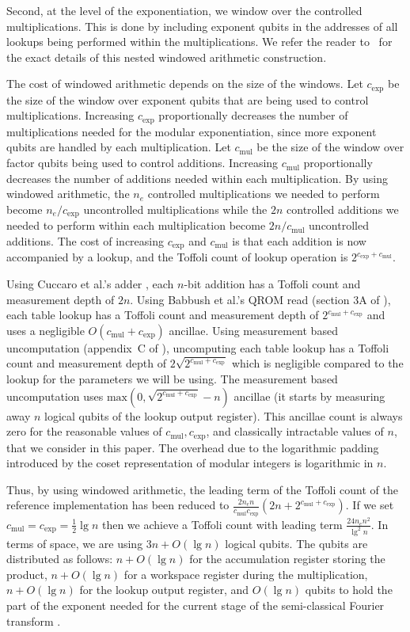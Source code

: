 \documentclass[superscriptaddress,notitlepage,longbibliography]{revtex4-1}
\theoremstyle{definition}
\theoremstyle{definition}
\newcommand{\lenexp}{{n_e}}
\newcommand{\gexp}{{c_{\text{exp}}}}
\newcommand{\gmul}{{c_{\text{mul}}}}
\begin{document}
Second, at the level of the exponentiation, we window over the controlled multiplications.
This is done by including exponent qubits in the addresses of all lookups being performed within the multiplications.
We refer the reader to~\cite{gidney2019windowedarithmetic} for the exact details of this nested windowed arithmetic construction.

The cost of windowed arithmetic depends on the size of the windows.
Let $\gexp$ be the size of the window over exponent qubits that are being used to control multiplications.
Increasing $\gexp$ proportionally decreases the number of multiplications needed for the modular exponentiation, since more exponent qubits are handled by each multiplication.
Let $\gmul$ be the size of the window over factor qubits being used to control additions.
Increasing $\gmul$ proportionally decreases the number of additions needed within each multiplication.
By using windowed arithmetic, the $\lenexp$ controlled multiplications we needed to perform become $\lenexp / \gexp$ uncontrolled multiplications while the $2 n$ controlled additions we needed to perform within each multiplication become $2 n / \gmul$ uncontrolled additions.
The cost of increasing $\gexp$ and $\gmul$ is that each addition is now accompanied by a lookup, and the Toffoli count of lookup operation is $2^{\gexp + \gmul}$.

Using Cuccaro et al.'s adder \cite{cuccaro2004adder}, each $n$-bit addition has a Toffoli count and measurement depth of $2n$.
Using Babbush et al.'s QROM read (section 3A of \cite{babbush2018}), each table lookup has a Toffoli count and measurement depth of $2^{\gmul+\gexp}$ and uses a negligible $O(\gmul + \gexp)$ ancillae.
Using measurement based uncomputation (appendix~C of \cite{berry2019qubitization}), uncomputing each table lookup has a Toffoli count and measurement depth of $2 \sqrt{2^{\gmul + \gexp}}$ which is negligible compared to the lookup for the parameters we will be using.
The measurement based uncomputation uses $\text{max}(0, \sqrt{2^{\gmul + \gexp}} - n)$ ancillae (it starts by measuring away $n$ logical qubits of the lookup output register).
This ancillae count is always zero for the reasonable values of $\gmul, \gexp$, and classically intractable values of $n$, that we consider in this paper.
The overhead due to the logarithmic padding introduced by the coset representation of modular integers is logarithmic in $n$.

Thus, by using windowed arithmetic, the leading term of the Toffoli count of the reference implementation has been reduced to $\frac{2 \lenexp n}{\gmul \gexp} (2n + 2^{\gmul + \gexp})$.
If we set $\gmul = \gexp = \frac{1}{2} \lg n$ then we achieve a Toffoli count with leading term $\frac{24 \lenexp n^2}{\lg^2 n}$.
In terms of space, we are using $3n + O(\lg n)$ logical qubits.
The qubits are distributed as follows:
  $n+O(\lg n)$ for the accumulation register storing the product,
  $n+O(\lg n)$ for a workspace register during the multiplication,
  $n + O(\lg n)$ for the lookup output register,
  and $O(\lg n)$ qubits to hold the part of the exponent needed for the current stage of the semi-classical Fourier transform \cite{griffiths1996semiclassical}.
\end{document}
